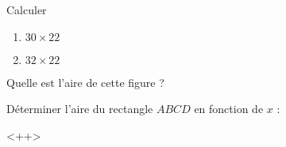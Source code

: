 \begin{MentalActivity}
    \begin{mental}
        Calculer
        \begin{enumerate}
            \item
                \( 30\times 22\)
            \item
                \( 32\times 22\)
        \end{enumerate}
    \end{mental}
    \begin{mental}
        Quelle est l'aire de cette figure ?
        \begin{center}
        \large
            
        \end{center}
    \end{mental}
    \begin{mental}
        Déterminer l'aire du rectangle \( ABCD\) en fonction de \( x\) :
\begin{center}
    \large
   
\end{center}
    \end{mental}
\end{MentalActivity}



\begin{MentalActivity}



\end{MentalActivity}


\begin{MentalActivity}




\end{MentalActivity}

\begin{MentalActivity}



\end{MentalActivity}

\begin{MentalActivity}



\end{MentalActivity}

\begin{MentalActivity}



\end{MentalActivity}

\begin{MentalActivity}



\end{MentalActivity}<++>



